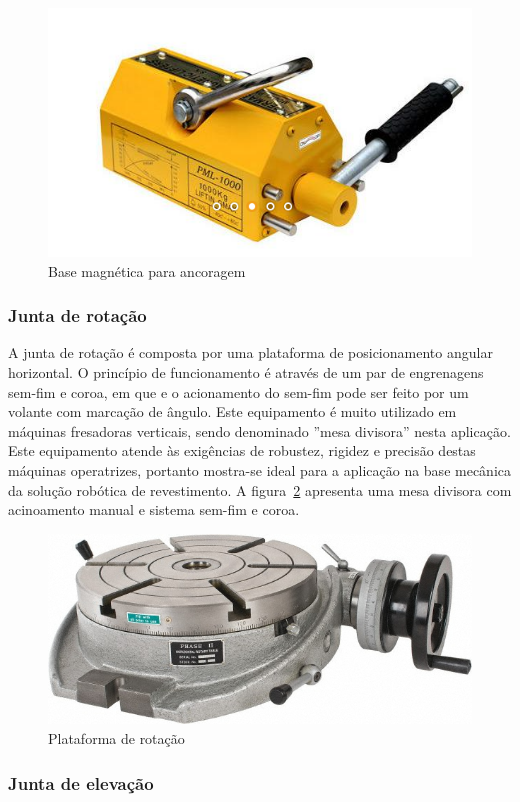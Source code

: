 \begin{figure}[h!]
	\centering
	\includegraphics[width=0.5\columnwidth]{figs/construcao/base_magnetica}
	\caption{Base magnética para ancoragem}
    \label{fig::base_magnetica}
\end{figure}

\subsubsection{Junta de rotação}

A junta de rotação é composta por uma plataforma de posicionamento angular
horizontal.
O princípio de funcionamento é através de um par de engrenagens sem-fim e coroa,
em que e o acionamento do sem-fim pode ser feito por um volante com marcação de
ângulo. Este equipamento é muito utilizado em máquinas fresadoras verticais,
sendo denominado ''mesa divisora'' nesta aplicação.
Este equipamento atende às exigências de robustez, rigidez e precisão destas
máquinas operatrizes, portanto mostra-se ideal para a aplicação na base mecânica
da solução robótica de revestimento. A figura~\ref{fig::rotary_table} apresenta
uma mesa divisora com acinoamento manual e sistema sem-fim e coroa.

\begin{figure}[h!]
	\centering
	\includegraphics[width=0.6\columnwidth]{figs/construcao/rotary_table}
	\caption{Plataforma de rotação}
    \label{fig::rotary_table}
\end{figure}

\subsubsection{Junta de elevação}


